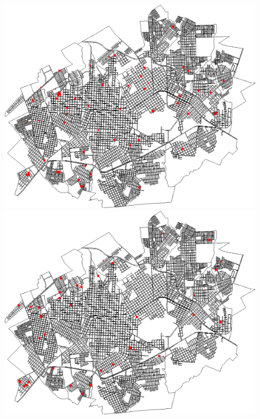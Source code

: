 \begin{figure}[H]
\begin{minipage}{.5\textwidth}
    \captionsetup{labelformat=empty}
  \end{minipage}
  \begin{minipage}{.5\textwidth}
    \centering
    \includegraphics[width=1.0\textwidth]{Figuras/Resultados/0001/Saidas_GPU_BIT/MonteCarlo_0/Simulacao_0/Casos/00080.png}
    \captionsetup{labelformat=empty}
  \end{minipage}%
  \centering
  \begin{minipage}{.5\textwidth}
    \centering
    \includegraphics[width=1.0\textwidth]{Figuras/Resultados/0001/Saidas_GPU_BIT/MonteCarlo_0/Simulacao_0/Casos/00120.png}

\end{minipage}
\end{figure}
